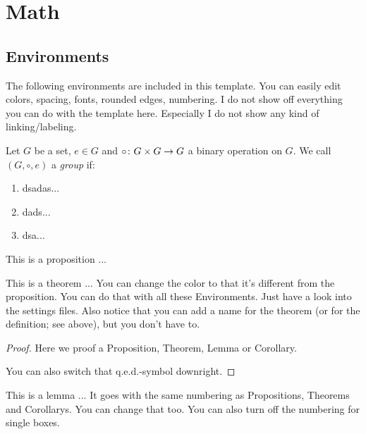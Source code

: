 \documentclass[11pt, a4paper]{article}
\begin{document}
\section{Math}

\subsection{Environments}

The following environments are included in this template. You can easily edit colors, spacing, fonts, rounded edges, numbering.
I do not show off everything you can do with the template here. Especially I do not show any kind of linking/labeling.

\begin{definition}[Group]
	Let $G$ be a set, $e \in G$ and $\circ \colon G \times G \to G$ a binary operation on $G$. We call $(G, \circ, e)$ a \emph{group} if:
	
	\begin{enumerate}[(G1)]
		\item dsadas...
		\item dads...
		\item dsa...
	\end{enumerate}
\end{definition}

\begin{proposition}
	This is a proposition ...
\end{proposition}

\begin{theorem}
	This is a theorem ...
	You can change the color to that it's different from the proposition. You can do that with all these Environments. Just have a look into the settings files. Also notice that you can add a name for the theorem (or for the definition; see above), but you don't have to.
\end{theorem}

\begin{proof}
	Here we proof a Proposition, Theorem, Lemma or Corollary.
	
	You can also switch that q.e.d.-symbol downright.
\end{proof}

\begin{lemma}
	This is a lemma ...
	It goes with the same numbering as Propositions, Theorems and Corollarys. You can change that too. You can also turn off the numbering for single boxes.
\end{lemma}
\end{document}
